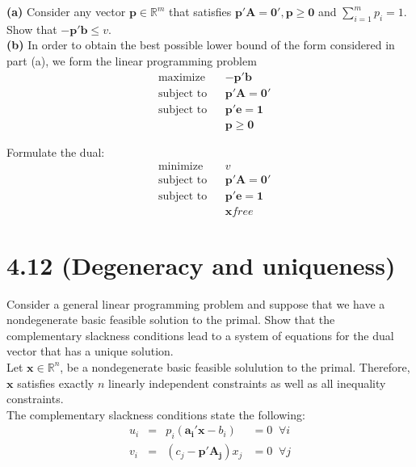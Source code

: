 \documentclass{article}
\begin{document}
\noindent
\textbf{(a)} Consider any vector $\mathbf{p} \in \mathbb{R}^m$ that satisfies $\mathbf{p'A = 0', p \geq 0}$ and $\sum_{i=1}^m p_i = 1$.  Show that $\mathbf{-p'b} \leq v$. \\


\noindent
\textbf{(b)}  In order to obtain the best possible lower bound of the form considered in part (a), we form the linear programming problem
\begin{equation*}
\begin{aligned}
& \text{maximize} && \mathbf{-p'b} \\
& \text{subject to} &&  \mathbf{p'A = 0'} \\
& \text{subject to} &&  \mathbf{p'e = 1} \\
& & &\mathbf{p \geq 0}
\end{aligned}
\end{equation*}

\noindent
Formulate the dual:
\begin{equation*}
\begin{aligned}
& \text{minimize} && v \\
& \text{subject to} &&  \mathbf{p'A = 0'} \\
& \text{subject to} &&  \mathbf{p'e = 1} \\
& & &\mathbf{x} free
\end{aligned}
\end{equation*}

\section*{4.12 (Degeneracy and uniqueness)}
Consider a general linear programming problem and suppose that we have a nondegenerate basic feasible solution to the primal.  Show that the complementary slackness conditions lead to a system of equations for the dual vector that has a unique solution.\\

\noindent
Let $\mathbf{x} \in \mathbb{R}^n$, be a nondegenerate basic feasible solulution to the primal.  Therefore, $\mathbf{x}$ satisfies exactly $n$ linearly independent constraints as well as all inequality constraints.\\
The complementary slackness conditions state the following:\\

\begin{equation*}
\begin{aligned}
u_i & = & p_i (\mathbf{a_i'x} - b_i) & = 0 \; \; \forall i \\
v_i & = & (c_j - \mathbf{p' A_j}) x_j & = 0 \; \; \forall j
\end{aligned}
\end{equation*}
\end{document}
